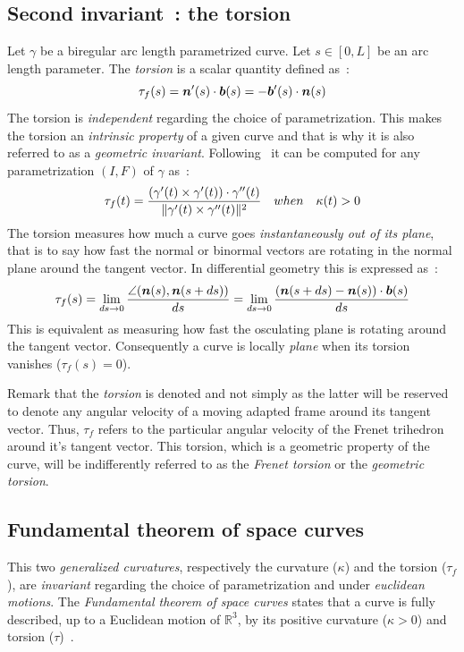 \subsection{Second invariant~: the torsion}\label{sec:torsion}
Let $\gamma$ be a biregular arc length parametrized curve. Let $s \in [0,L]$ be an arc length parameter. The \emph{torsion} is a scalar quantity defined as~:
\begin{equation}
	\tau_f(s) = \boldsymbol{n}'(s) \cdot \boldsymbol{b}(s) = - \boldsymbol{b}'(s) \cdot \boldsymbol{n}(s)
\end{equation}
The torsion is \emph{independent} regarding the choice of parametrization. This makes the torsion an \emph{intrinsic property} of a given curve and that is why it is also referred to as a \emph{geometric invariant}. Following~\cite[p.204]{Gray2006} it can be computed for any parametrization $(I,F)$ of $\gamma$ as~:
\begin{equation}
	\tau_f(t) = \frac{(\gamma'(t) \times \gamma'(t)) \cdot \gamma''(t)}{\lVert\gamma'(t) \times \gamma''(t)\rVert^2}
	\quad when \quad
	\kappa(t) > 0
\end{equation}
The torsion measures how much a curve goes \emph{instantaneously out of its plane}, that is to say how fast the normal or binormal vectors are rotating in the normal plane around the tangent vector. In differential geometry this is expressed as~:
\begin{equation}
	\tau_f(s) 
	= \lim_{ds \to 0}\frac{\angle(\boldsymbol{n}(s),\boldsymbol{n}(s+ds))}{ds}
	= \lim_{ds \to 0}\frac{(\boldsymbol{n}(s+ds) - \boldsymbol{n}(s)) \cdot \boldsymbol{b}(s)}{ds}
\end{equation}
This is equivalent as measuring how fast the osculating plane is rotating around the tangent vector. Consequently a curve is locally \emph{plane} when its torsion vanishes ($\tau_f(s) = 0$).

Remark that the \emph{torsion} is denoted  and not simply \textquote{$\tau$} as the latter will be reserved to denote any angular velocity of a moving adapted frame around its tangent vector. Thus, $\tau_f$ refers to the particular angular velocity of the Frenet trihedron around it's tangent vector. This torsion, which is a geometric property of the curve, will be indifferently referred to as the \emph{Frenet torsion} or the \emph{geometric torsion}.

\subsection{Fundamental theorem of space curves}\label{sec:fundamental}
This two \emph{generalized curvatures}, respectively the curvature ($\kappa$) and the torsion ($\tau_f$), are \emph{invariant} regarding the choice of parametrization and under \emph{euclidean motions}. The \emph{Fundamental theorem of space curves} states that a curve is fully described, up to a Euclidean motion of ${\mathbb{R}}^3$, by its positive curvature ($\kappa > 0$) and torsion ($\tau$)~\cite[p.229]{Gray2006}.

